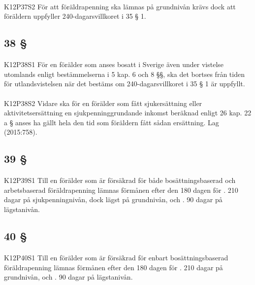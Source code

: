 \documentclass[a4paper,notitlepage,openany,10pt]{book}
\begin{document}
\paragraph*{}
{\tiny K12P37S2}
För att föräldrapenning ska lämnas på grundnivån krävs dock att föräldern uppfyller 240-dagarsvillkoret i 35 § 1.
\subsection*{38 §}
\paragraph*{}
{\tiny K12P38S1}
För en förälder som anses bosatt i Sverige även under vistelse utomlands enligt bestämmelserna i 5 kap. 6 och 8 §§, ska det bortses från tiden för utlandsvistelsen när det bestäms om 240-dagarsvillkoret i 35 § 1 är uppfyllt.
\paragraph*{}
{\tiny K12P38S2}
Vidare ska för en förälder som fått sjukersättning eller aktivitetsersättning en sjukpenninggrundande inkomst beräknad enligt 26 kap. 22 a § anses ha gällt hela den tid som föräldern fått sådan ersättning.
Lag (2015:758).
\subsection*{39 §}
\paragraph*{}
{\tiny K12P39S1}
Till en förälder som är försäkrad för både bosättningsbaserad och arbetsbaserad föräldrapenning lämnas förmånen efter den 180 dagen för
. 210 dagar på sjukpenningnivån, dock lägst på grundnivån, och
. 90 dagar på lägstanivån.
\subsection*{40 §}
\paragraph*{}
{\tiny K12P40S1}
Till en förälder som är försäkrad för enbart bosättningsbaserad föräldrapenning lämnas förmånen efter den 180 dagen för
. 210 dagar på grundnivån, och
. 90 dagar på lägstanivån.
\end{document}
